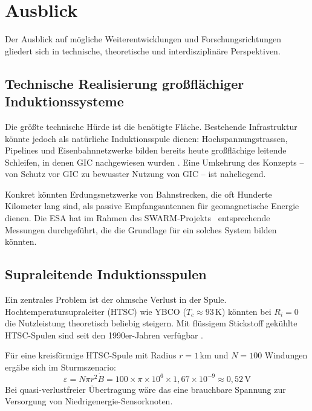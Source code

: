 ﻿\documentclass[a4paper,12pt]{article}
\theoremstyle{definition}
\begin{document}
\section{Ausblick}

Der Ausblick auf m\"ogliche Weiterentwicklungen und Forschungsrichtungen
gliedert sich in technische, theoretische und interdisziplin\"are Perspektiven.

\subsection{Technische Realisierung gro{\ss}fl\"achiger Induktionssysteme}

Die gr\"o{\ss}te technische H\"urde ist die ben\"otigte Fl\"ache. Bestehende
Infrastruktur k\"onnte jedoch als nat\"urliche Induktionsspule dienen:
Hochspannungstrassen, Pipelines und Eisenbahnnetzwerke bilden bereits
heute gro{\ss}fl\"achige leitende Schleifen, in denen GIC nachgewiesen wurden
\cite{pirjola2000geomagnetically}.
Eine Umkehrung des Konzepts -- von Schutz vor GIC zu bewusster Nutzung
von GIC -- ist naheliegend.

Konkret k\"onnten Erdungsnetzwerke von Bahnstrecken, die oft Hunderte
Kilometer lang sind, als passive Empfangsantennen f\"ur geomagnetische
Energie dienen. Die ESA hat im Rahmen des SWARM-Projekts~\cite{friis2006swarm}
entsprechende Messungen durchgef\"uhrt, die die Grundlage f\"ur ein
solches System bilden k\"onnten.

\subsection{Supraleitende Induktionsspulen}

Ein zentrales Problem ist der ohmsche Verlust in der Spule.
Hochtemperatursupraleiter (HTSC) wie YBCO ($T_c \approx 93\,\mathrm{K}$)
k\"onnten bei $R_i = 0$ die Nutzleistung theoretisch beliebig steigern.
Mit fl\"ussigem Stickstoff gek\"uhlte HTSC-Spulen sind seit den 1990er-Jahren
verf\"ugbar \cite{larbalestier2001high}.

F\"ur eine kreisf\"ormige HTSC-Spule mit Radius $r = 1\,\mathrm{km}$
und $N = 100$ Windungen erg\"abe sich im Sturmszenario:
\[
    \varepsilon = N \pi r^2 \dot{B}
    = 100 \times \pi \times 10^6 \times 1{,}67 \times 10^{-9}
    \approx 0{,}52\,\mathrm{V}
\]
Bei quasi-verlustfreier \"Ubertragung w\"are das eine brauchbare Spannung
zur Versorgung von Niedrig\-energie-Sensorknoten.
\end{document}
